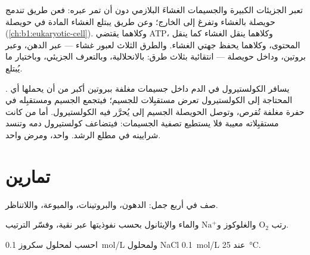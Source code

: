 \begin{proposition}\label{prop:b1:membranes-transport:vesicles}
تعبر الجزيئات الكبيرة والجسيمات الغشاءَ البلازمي دون أن تمر عبره:
فعن طريق \emph{} تندمج حويصلة بالغشاء وتفرغ إلى الخارج؛
وعن طريق \emph{} يبتلع الغشاء المادة في حويصلة
(\cref{ch:b1:eukaryotic-cell}).
وكلاهما يقتضي ATP، وكلاهما ينقل الغشاء كما ينقل المحتوى، وكلاهما يحفظ
جهتي الغشاء. والطرق الثلاث لعبور غشاء --- عبر الدهن، وعبر بروتين،
وداخل حويصلة --- انتقائية بثلاث طرق: بالانحلالية، وبالتعرف الجزيئي،
وباختيار ما يُبتلع.
\end{proposition}

\begin{example}\label{ex:b1:membranes-transport:ldl}
يسافر الكولستيرول في الدم داخل جسيمات مغلفة ببروتين أكبر من أن
يحملها أي .  المحتاجة إلى الكولستيرول تعرض مستقبِلات
للجسيم؛ فيتجمع الجسيم ومستقبِله في حفرة مغلفة تُقرص، وتوصل الحويصلة
الجسيم إلى  يُحرَّر فيه الكولستيرول. أما من كانت مستقبِلاته
معيبة فلا يستطيع تصفية الجسيمات: فيتضاعف كولستيرول دمه وتنسد شرايينه
في مطلع الرشد.  واحد، ومرض واحد.
\end{example}

\section{تمارين}

\begin{exercise}[$\star$]\label{exo:b1:membranes-transport:1}
صف  في أربع جمل: الدهون، والبروتينات،
والميوعة، واللاتناظر.
\end{exercise}

\begin{exercise}[$\star$]\label{exo:b1:membranes-transport:2}
رتب $\mathrm{O_2}$ والغلوكوز و$\mathrm{Na^+}$ والماء والإيثانول بحسب
نفوذيتها عبر  نقية، وفسّر الترتيب.
\end{exercise}

\begin{exercise}[$\star$]\label{exo:b1:membranes-transport:3}
احسب  لمحلول سكروز \qty{0.1}{mol/L} ولمحلول NaCl
\qty{0.1}{mol/L} عند \qty{25}{\celsius}.
\end{exercise}

